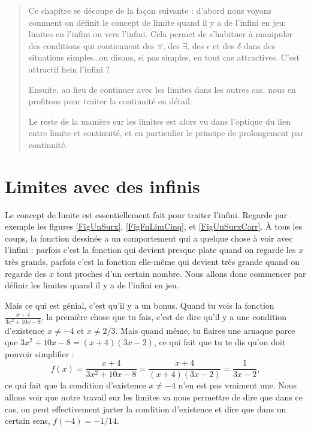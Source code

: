 

\begin{abstract}
Ce chapitre se découpe de la façon suivante : d'abord nous voyons comment on définit le concept de limite quand il y a de l'infini en jeu; limites en l'infini ou vers l'infini. Cela permet de s'habituer à manipuler des conditions qui contiennent des $\forall$, des $\exists$, des $\epsilon$ et des $\delta$ dans  des situations simples\ldots ou disons, si pas simples, en tout cas attractives. C'est attractif hein l'infini ?

Ensuite, au lieu de continuer avec les limites dans les autres cas, nous en profitons pour traiter la continuité en détail.

Le reste de la manière sur les limites est alors vu dans l'optique du lien entre limite et continuité, et en particulier le principe de prolongement par continuité.
\end{abstract}


\section{Limites avec des infinis}

Le concept de limite est essentiellement fait pour traiter l'infini. Regarde par exemple les figures \ref{FigUnSurx}, \ref{FigFnLimCinq}, et \ref{FigUnSurxCarr}. À tous les coups, la fonction dessinée a un comportement qui a quelque chose à voir avec l'infini : parfois c'est la fonction qui devient presque plate quand on regarde les $x$ très grands, parfois c'est la fonction elle-même qui devient très grande quand on regarde des $x$ tout proches d'un certain nombre. Nous allons donc commencer par définir les limites quand il y a de l'infini en jeu.

Mais ce qui est génial, c'est qu'il y a un bonus\label{PgBonusLimite}. Quand tu vois la fonction $\frac{ x+4 }{ 3x^2+10x-8 }$, la première chose que tu fais, c'est de dire qu'il y a une condition d'existence $x\neq -4$ et $x\neq 2/3$. Mais quand même, tu flaires une arnaque parce que $3x^2+10x-8=(x+4)(3x-2)$, ce qui fait que tu te dis qu'on doit pouvoir simplifier :
\[ 
 f(x)= \frac{ x+4 }{ 3x^2+10x-8 }=\frac{ x+4 }{ (x+4)(3x-2) }=\frac{ 1 }{ 3x-2 },
\]
ce qui fait que la condition d'existence $x\neq -4$ n'en est pas vraiment une. Nous allons voir que notre travail sur les limites va nous permettre de dire que dans ce cas, on peut effectivement jarter la condition d'existence et dire que dans un certain sens, $f(-4)=-1/14$.

